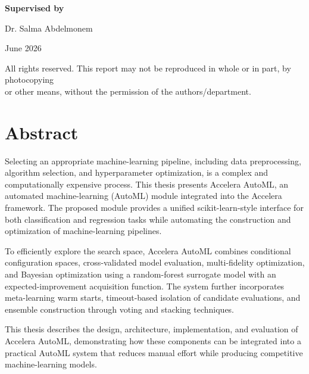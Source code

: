 \documentclass[12pt,a4paper,oneside]{report}
\newcommand{\systemname}{Accelera AutoML}
\begin{document}
\begin{titlepage}
\begin{center}
\vspace{0.45cm}

{\fontsize{16}{19}\bfseries Supervised by\par}
\vspace{0.05cm}
{Dr. Salma Abdelmonem\par}

\vspace{0.22cm}

{June 2026\par}

\vspace{0.35cm}

{\scriptsize
All rights reserved. This report may not be reproduced in whole or in part, by photocopying\\
or other means, without the permission of the authors/department.}
\end{center}

\end{titlepage}
\restoregeometry
\clearpage
\onehalfspacing

\chapter*{Abstract}
Selecting an appropriate machine-learning pipeline, including data preprocessing,
algorithm selection, and hyperparameter optimization, is a complex and
computationally expensive process. This thesis presents \systemname{}, an
automated machine-learning (AutoML) module integrated into the Accelera
framework. The proposed module provides a unified scikit-learn-style interface
for both classification and regression tasks while automating the construction
and optimization of machine-learning pipelines.

\medskip

\noindent
To efficiently explore the search space, \systemname{} combines conditional
configuration spaces, cross-validated model evaluation, multi-fidelity
optimization, and Bayesian optimization using a random-forest surrogate model
with an expected-improvement acquisition function. The system further
incorporates meta-learning warm starts, timeout-based isolation of candidate
evaluations, and ensemble construction through voting and stacking techniques.

\medskip

\noindent
This thesis describes the design, architecture, implementation, and evaluation
of \systemname{}, demonstrating how these components can be integrated into a
practical AutoML system that reduces manual effort while producing competitive
machine-learning models.
\end{document}
